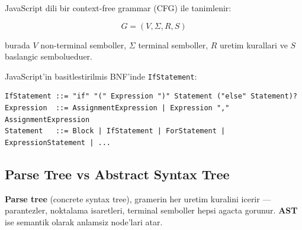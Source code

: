 JavaScript dili bir context-free grammar (CFG) ile tanimlenir:

\begin{equation}
G = (V, \Sigma, R, S)
\end{equation}

burada $V$ non-terminal semboller, $\Sigma$ terminal semboller, $R$ uretim kurallari ve $S$ baslangic sembolueduer.

JavaScript'in basitlestirilmis BNF'inde \texttt{IfStatement}:

\begin{lstlisting}[basicstyle=\ttfamily\small\color{white}, frame=none]
IfStatement ::= "if" "(" Expression ")" Statement ("else" Statement)?
Expression  ::= AssignmentExpression | Expression "," AssignmentExpression
Statement   ::= Block | IfStatement | ForStatement | ExpressionStatement | ...
\end{lstlisting}

\subsection{Parse Tree vs Abstract Syntax Tree}

\textbf{Parse tree} (concrete syntax tree), gramerin her uretim kuralini icerir --- parantezler, noktalama isaretleri, terminal semboller hepsi agacta gorunur. \textbf{AST} ise semantik olarak anlamsiz node'lari atar.

\begin{center}
\end{center}

